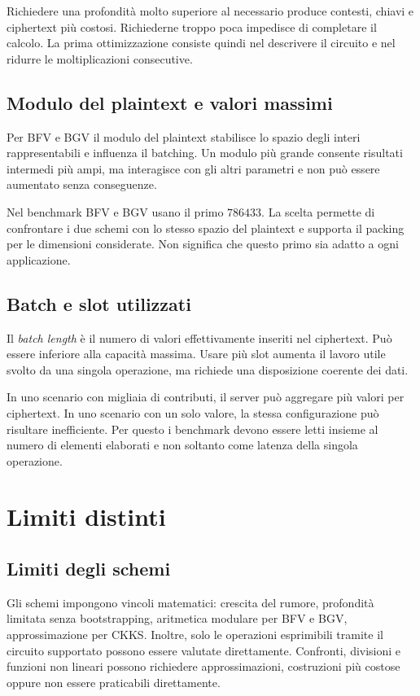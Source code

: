 Richiedere una profondit\`a molto superiore al necessario produce contesti, chiavi e ciphertext pi\`u costosi. Richiederne troppo poca impedisce di completare il calcolo. La prima ottimizzazione consiste quindi nel descrivere il circuito e nel ridurre le moltiplicazioni consecutive.

\subsection{Modulo del plaintext e valori massimi}
Per BFV e BGV il modulo del plaintext stabilisce lo spazio degli interi rappresentabili e influenza il batching. Un modulo pi\`u grande consente risultati intermedi pi\`u ampi, ma interagisce con gli altri parametri e non pu\`o essere aumentato senza conseguenze.

Nel benchmark BFV e BGV usano il primo $786433$. La scelta permette di confrontare i due schemi con lo stesso spazio del plaintext e supporta il packing per le dimensioni considerate. Non significa che questo primo sia adatto a ogni applicazione.

\subsection{Batch e slot utilizzati}
Il \emph{batch length} \`e il numero di valori effettivamente inseriti nel ciphertext. Pu\`o essere inferiore alla capacit\`a massima. Usare pi\`u slot aumenta il lavoro utile svolto da una singola operazione, ma richiede una disposizione coerente dei dati.

In uno scenario con migliaia di contributi, il server pu\`o aggregare pi\`u valori per ciphertext. In uno scenario con un solo valore, la stessa configurazione pu\`o risultare inefficiente. Per questo i benchmark devono essere letti insieme al numero di elementi elaborati e non soltanto come latenza della singola operazione.

\section{Limiti distinti}
\subsection{Limiti degli schemi}
Gli schemi impongono vincoli matematici: crescita del rumore, profondit\`a limitata senza bootstrapping, aritmetica modulare per BFV e BGV, approssimazione per CKKS. Inoltre, solo le operazioni esprimibili tramite il circuito supportato possono essere valutate direttamente. Confronti, divisioni e funzioni non lineari possono richiedere approssimazioni, costruzioni pi\`u costose oppure non essere praticabili direttamente.


